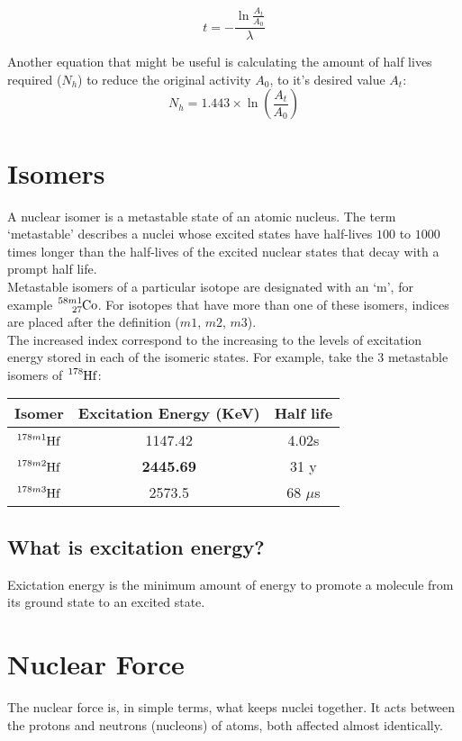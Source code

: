 \documentclass{article}
\begin{document}
\begin{multicols*}{2}
    \[
      t = -\frac{\ln{\frac{A_t}{A_0}}}{\lambda}
    \]

    Another equation that might be useful is calculating the amount of half lives
    required ($N_h$) to reduce the original activity $A_0$, to it's desired value $A_t$:
    \[
      N_h = 1.443 \times \ln{\left( \frac{A_t}{A_0} \right)}
    \]

    \section{Isomers}
    A nuclear isomer is a metastable state of an atomic nucleus. The term
    `metastable' describes a nuclei whose excited states have half-lives $100$
    to $1000$ times longer than the half-lives of the excited nuclear states
    that decay with a prompt half life.\\

    Metastable isomers of a particular isotope are designated with an `m',
    for example $\ce{^{58m1}_{27}Co}$. For isotopes that have more than one
    of these isomers, indices are placed after the definition ($m1$, $m2$,
    $m3$).\\

    The increased index correspond to the increasing to the levels of excitation
    energy stored in each of the isomeric states. For example, take the $3$
    metastable isomers of $\ce{^{178}Hf}$:\\

    \begin{tabular}{|c|c|c|}
      \hline
      Isomer & Excitation Energy (KeV) & Half life \\
      \hline
      $\ce{^{178m1}Hf}$ & 1147.42 & 4.02s \\
      $\ce{^{178m2}Hf}$ & \textbf{2445.69} & 31 y \\
      $\ce{^{178m3}Hf}$ & 2573.5 & 68 $\mu$s \\
      \hline
    \end{tabular}

    \subsection{What is excitation energy?}
    Exictation energy is the minimum amount of energy to promote a molecule
    from its ground state to an excited state.


    \section{Nuclear Force}
    The nuclear force is, in simple terms, what keeps nuclei together. It
    acts between the protons and neutrons (nucleons) of atoms, both affected
    almost identically.\\


\end{multicols*}
\end{document}
